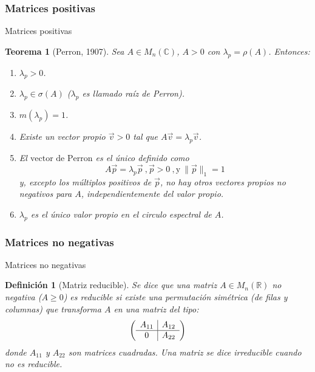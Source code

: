 \documentclass[ignorenonframetext,aspectratio=43,]{beamer}
\newtheorem{teorema}{Teorema}
\newtheorem{definicion}{Definición}
\begin{document}
\subsubsection{Matrices positivas}

\begin{frame}{Matrices positivas}
\begin{teorema}[Perron, 1907]
\label{perron}
Sea $A \in M_n(\mathbb{C})$, $A > 0$ con $\lambda_p = \rho(A)$. Entonces:
\begin{enumerate}
\item $\lambda_p >0$.
\item $\lambda_p \in \sigma(A)$ ($\lambda_p$ es llamado raíz de Perron).
\item $m(\lambda_p) = 1$.
\item Existe un vector propio $\vec{v} >0$ tal que $A\vec{v} = \lambda_p \vec{v}$.
\item El $\textrm{vector de Perron}$ es el único definido como
$$A\vec{p} = \lambda_p \vec{p} \ , \vec{p} > 0 \ , \textrm{y} \ \|\vec{p}\|_1 = 1 $$
y, excepto los múltiplos positivos de $\vec{p}$, no hay otros vectores propios no negativos para $A$, independientemente del valor propio.
\item $\lambda_p$ es el único valor propio en el circulo espectral de $A$.
\end{enumerate}
\end{teorema}
\end{frame}

\subsubsection{Matrices no negativas}

\begin{frame}{Matrices no negativas}

\begin{definicion}[Matriz reducible]
Se dice que una matriz $A \in M_n(\mathbb{R})$ no negativa ($A \geq 0$) es reducible si existe una permutación simétrica (de filas y columnas) que transforma $A$ en una matriz del tipo:
$$\left(
      \begin{array}{{c|c}}
            A_{11}    &    A_{12}  \\\hline
            0         &    A_{22}     \\
      \end{array}   \right)$$
donde $A_{11}$ y $A_{22}$ son matrices cuadradas. Una matriz se dice irreducible cuando no es reducible.
\end{definicion}
\end{frame}
\end{document}
